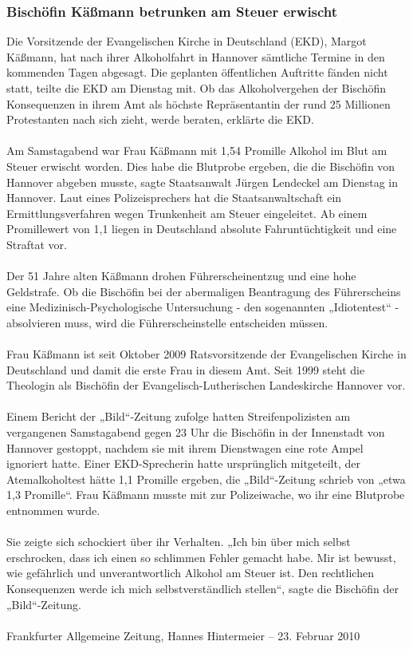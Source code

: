 \documentclass[a4paper,12pt,oneside]{scrbook}
\begin{document}
\subsubsection{Bischöfin Käßmann betrunken am Steuer erwischt}
Die Vorsitzende der Evangelischen Kirche in Deutschland (EKD), Margot Käßmann, hat nach ihrer Alkoholfahrt in Hannover sämtliche Termine in den kommenden Tagen abgesagt. Die geplanten öffentlichen Auftritte fänden nicht statt, teilte die EKD am Dienstag mit. Ob das Alkoholvergehen der Bischöfin Konsequenzen in ihrem Amt als höchste Repräsentantin der rund 25 Millionen Protestanten nach sich zieht, werde beraten, erklärte die EKD.
\\\\
Am Samstagabend war Frau Käßmann mit 1,54 Promille Alkohol im Blut am Steuer erwischt worden. Dies habe die Blutprobe ergeben, die die Bischöfin von Hannover abgeben musste, sagte Staatsanwalt Jürgen Lendeckel am Dienstag in Hannover. Laut eines Polizeisprechers hat die Staatsanwaltschaft ein Ermittlungsverfahren wegen Trunkenheit am Steuer eingeleitet. Ab einem Promillewert von 1,1 liegen in Deutschland absolute Fahruntüchtigkeit und eine Straftat vor.
\\\\
Der 51 Jahre alten Käßmann drohen Führerscheinentzug und eine hohe Geldstrafe. Ob die Bischöfin bei der abermaligen Beantragung des Führerscheins eine Medizinisch-Psychologische Untersuchung - den sogenannten „Idiotentest“ - absolvieren muss, wird die Führerscheinstelle entscheiden müssen.
\\\\
Frau Käßmann ist seit Oktober 2009 Ratsvorsitzende der Evangelischen Kirche in Deutschland und damit die erste Frau in diesem Amt. Seit 1999 steht die Theologin als Bischöfin der Evangelisch-Lutherischen Landeskirche Hannover vor.
\\\\
Einem Bericht der „Bild“-Zeitung zufolge hatten Streifenpolizisten am vergangenen Samstagabend gegen 23 Uhr die Bischöfin in der Innenstadt von Hannover gestoppt, nachdem sie mit ihrem Dienstwagen eine rote Ampel ignoriert hatte. Einer EKD-Sprecherin hatte ursprünglich mitgeteilt, der Atemalkoholtest hätte 1,1 Promille ergeben, die „Bild“-Zeitung schrieb von „etwa 1,3 Promille“. Frau Käßmann musste mit zur Polizeiwache, wo ihr eine Blutprobe entnommen wurde.
\\\\
Sie zeigte sich schockiert über ihr Verhalten. „Ich bin über mich selbst erschrocken, dass ich einen so schlimmen Fehler gemacht habe. Mir ist bewusst, wie gefährlich und unverantwortlich Alkohol am Steuer ist. Den rechtlichen Konsequenzen werde ich mich selbstverständlich stellen“, sagte die Bischöfin der „Bild“-Zeitung.
\\\\
\newpage
Frankfurter Allgemeine Zeitung, Hannes Hintermeier \hfill -- \hfill 23. Februar 2010
\end{document}
